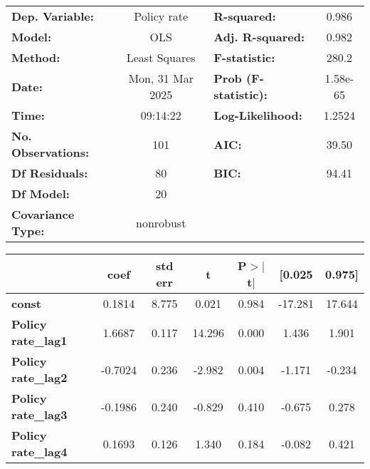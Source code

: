 \begin{center}
\begin{tabular}{lclc}
\toprule
\textbf{Dep. Variable:}         &   Policy rate    & \textbf{  R-squared:         } &     0.986   \\
\textbf{Model:}                 &       OLS        & \textbf{  Adj. R-squared:    } &     0.982   \\
\textbf{Method:}                &  Least Squares   & \textbf{  F-statistic:       } &     280.2   \\
\textbf{Date:}                  & Mon, 31 Mar 2025 & \textbf{  Prob (F-statistic):} &  1.58e-65   \\
\textbf{Time:}                  &     09:14:22     & \textbf{  Log-Likelihood:    } &    1.2524   \\
\textbf{No. Observations:}      &         101      & \textbf{  AIC:               } &     39.50   \\
\textbf{Df Residuals:}          &          80      & \textbf{  BIC:               } &     94.41   \\
\textbf{Df Model:}              &          20      & \textbf{                     } &             \\
\textbf{Covariance Type:}       &    nonrobust     & \textbf{                     } &             \\
\bottomrule
\end{tabular}
\begin{tabular}{lcccccc}
                                & \textbf{coef} & \textbf{std err} & \textbf{t} & \textbf{P$> |$t$|$} & \textbf{[0.025} & \textbf{0.975]}  \\
\midrule
\textbf{const}                  &       0.1814  &        8.775     &     0.021  &         0.984        &      -17.281    &       17.644     \\
\textbf{Policy rate\_lag1}      &       1.6687  &        0.117     &    14.296  &         0.000        &        1.436    &        1.901     \\
\textbf{Policy rate\_lag2}      &      -0.7024  &        0.236     &    -2.982  &         0.004        &       -1.171    &       -0.234     \\
\textbf{Policy rate\_lag3}      &      -0.1986  &        0.240     &    -0.829  &         0.410        &       -0.675    &        0.278     \\
\textbf{Policy rate\_lag4}      &       0.1693  &        0.126     &     1.340  &         0.184        &       -0.082    &        0.421     \\

\end{tabular}
\end{center}
